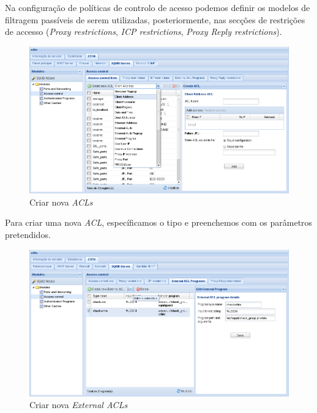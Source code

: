 Na configuração de políticas de controlo de acesso podemos definir os modelos de filtragem passíveis de serem utilizadas, posteriormente, nas secções de restrições de accesso (\textit{Proxy restrictions}, \textit{ICP restrictions}, \textit{Proxy Reply restrictions}).

\begin{figure}[H]
    \begin{center}
    \includegraphics[scale=0.38]{screenshots/etfw/etfw_squid_accesscontrol_02.png}
    \caption{Criar nova \textit{ACLs}}
    \label{fig:etfw_squid_accesscontrol_02}
    \end{center}
\end{figure}

Para criar uma nova \textit{ACL}, específicamos o tipo e preenchemos com os parâmetros pretendidos.

\begin{figure}[H]
    \begin{center}
    \includegraphics[scale=0.38]{screenshots/etfw/etfw_squid_accesscontrol_03.png}
    \caption{Criar nova \textit{External ACLs}}
    \label{fig:etfw_squid_accesscontrol_03}
    \end{center}
\end{figure}

